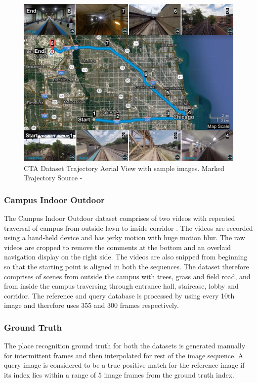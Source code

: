 \documentclass[letterpaper, 10 pt, conference]{ieeeconf}  %
\begin{document}
\begin{figure}
 \includegraphics[scale=0.25]{cta-datasetTrajSampleImages}
 \caption{CTA Dataset Trajectory Aerial View with sample images. Marked Trajectory Source - \cite{ctaTrajGMap}}
 \label{fig:ctaTraj}
\end{figure}


\subsubsection{Campus Indoor Outdoor}
The Campus Indoor Outdoor dataset comprises of two videos with repeated traversal of campus from outside lawn to inside corridor \cite{indoorOutdoor1,indoorOutdoor2}. The videos are recorded using a hand-held device and has jerky motion with huge motion blur. The raw videos are cropped to remove the comments at the bottom and an overlaid navigation display on the right side. The videos are also snipped from beginning so that the starting point is aligned in both the sequences. The dataset therefore comprises of scenes from outside the campus with trees, grass and field road, and from inside the campus traversing through entrance hall, staircase, lobby and corridor. The reference and query database is processed by using every 10th image and therefore uses 355 and 300 frames respectively.

\subsubsection{Ground Truth}
The place recognition ground truth for both the datasets is generated manually for intermittent frames and then interpolated for rest of the image sequence. A query image is considered to be a true positive match for the reference image if its index lies within a range of 5 image frames from the ground truth index.
\end{document}

